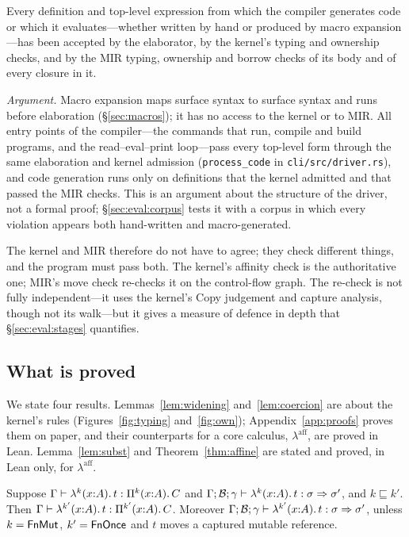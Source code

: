 \begin{proposition}\label{prop:pipeline}
Every definition and top-level expression from which the compiler generates code or which it evaluates---whether written by hand or produced by macro expansion---has been accepted by the elaborator, by the kernel's typing and ownership checks, and by the MIR typing, ownership and borrow checks of its body and of every closure in it.
\end{proposition}

\emph{Argument.}
Macro expansion maps surface syntax to surface syntax and runs before elaboration (\S\ref{sec:macros}); it has no access to the kernel or to MIR.
All entry points of the compiler---the commands that run, compile and build programs, and the read--eval--print loop---pass every top-level form through the same elaboration and kernel admission (\texttt{process\_code} in \texttt{cli/src/driver.rs}), and code generation runs only on definitions that the kernel admitted and that passed the MIR checks.
This is an argument about the structure of the driver, not a formal proof; \S\ref{sec:eval:corpus} tests it with a corpus in which every violation appears both hand-written and macro-generated.

The kernel and MIR therefore do not have to agree; they check different things, and the program must pass both.
The kernel's affinity check is the authoritative one; MIR's move check re-checks it on the control-flow graph.
The re-check is not fully independent---it uses the kernel's Copy judgement and capture analysis, though not its walk---but it gives a measure of defence in depth that \S\ref{sec:eval:stages} quantifies.

\subsection{What is proved}\label{sec:own:meta}

We state four results.
Lemmas~\ref{lem:widening} and~\ref{lem:coercion} are about the kernel's rules (Figures~\ref{fig:typing} and~\ref{fig:own}); Appendix~\ref{app:proofs} proves them on paper, and their counterparts for a core calculus, $\lambda^{\mathrm{aff}}$, are proved in Lean.
Lemma~\ref{lem:subst} and Theorem~\ref{thm:affine} are stated and proved, in Lean only, for $\lambda^{\mathrm{aff}}$.

\begin{lemma}\label{lem:widening}
Suppose $\Gamma \vdash \lambda^{k}(x{:}A).\,t : \Pi^{k}(x{:}A).\,C$ and $\Gamma;\mathcal{B};\gamma \vdash \lambda^{k}(x{:}A).\,t : \sigma \Rightarrow \sigma'$, and $k \sqsubseteq k'$.
Then $\Gamma \vdash \lambda^{k'}(x{:}A).\,t : \Pi^{k'}(x{:}A).\,C$.
Moreover $\Gamma;\mathcal{B};\gamma \vdash \lambda^{k'}(x{:}A).\,t : \sigma \Rightarrow \sigma'$, unless $k = \mathsf{FnMut}$, $k' = \mathsf{FnOnce}$ and $t$ moves a captured mutable reference.
\end{lemma}

